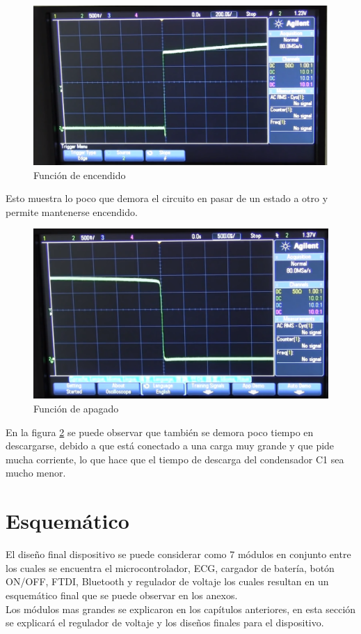 \begin{figure}[H]
\centering
\includegraphics[scale=0.23]{figuras/eagle/on.png}
\caption{Función de encendido}
\label{on}
\end{figure}

Esto muestra lo poco que demora el circuito en pasar de un estado a otro y permite mantenerse encendido.

\begin{figure}[H]
\centering
\includegraphics[scale=0.23]{figuras/eagle/off.png}
\caption{Función de apagado}
\label{off}
\end{figure}

En la figura \ref{off} se puede observar que también se demora poco tiempo en descargarse, debido a que está conectado a una carga muy grande y que pide mucha corriente, lo que hace que el tiempo de descarga del condensador C1 sea mucho menor. 

\section{Esquemático}
El diseño final dispositivo se puede considerar como 7 módulos en conjunto entre los cuales se encuentra el microcontrolador, ECG, cargador de batería, botón ON/OFF, FTDI, Bluetooth y regulador de voltaje los cuales resultan en un esquemático final que se puede observar en los anexos.\\
Los módulos mas grandes se explicaron en los capítulos anteriores, en esta sección se explicará el regulador de voltaje y los diseños finales para el dispositivo.
